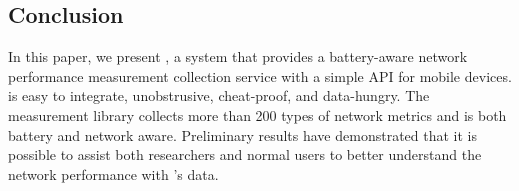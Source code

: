 \subsection{Conclusion}
\label{ss:conclusion}
In this paper, we present \name{}, a system that
provides a battery-aware network performance
measurement collection service with a simple API for
mobile devices. \name{} is easy to integrate, unobstrusive,
cheat-proof, and data-hungry. The measurement library 
collects more than 200 types of network metrics and is
both battery and network aware. Preliminary results
have demonstrated that it is possible to assist both
researchers and normal users to better understand the 
network performance with \name{}'s data.
